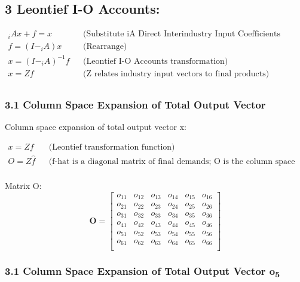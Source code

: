 \documentclass[
  letterpaper,
  DIV=11,
  numbers=noendperiod]{scrartcl}
\begin{document}
\hypertarget{leontief-i-o-accounts}{%
\subsection{3 Leontief I-O Accounts:}\label{leontief-i-o-accounts}}

\[
\begin{align}
    _{i}Ax+f=x && \text{(Substitute iA Direct Interindustry Input Coefficients matrix)}\\
        f=(I-_{i}A)x && \text{(Rearrange)}\\
    x = (I-_{i}A)^{-1}f && \text{(Leontief I-O Accounts transformation)}\\
    x = Zf && \text{(Z relates industry input vectors to final products)}\\
\end{align}
\]

\hypertarget{column-space-expansion-of-total-output-vector}{%
\subsubsection{3.1 Column Space Expansion of Total Output
Vector}\label{column-space-expansion-of-total-output-vector}}

Column space expansion of total output vector x:

\[
\begin{align}
    x = Zf && \text{(Leontief transformation function)}\\
    O = Z\hat{f} && \text{(f-hat is a diagonal matrix of final demands; O is the column space of x)}\\
\end{align}\]

Matrix O: \[\mathbf{O} = \left[\begin{array}
{rrr}
o_{11} & o_{12} & o_{13} & o_{14} & o_{15} & o_{16} \\
o_{21} & o_{22} & o_{23} & o_{24} & o_{25} & o_{26} \\
o_{31} & o_{32} & o_{33} & o_{34} & o_{35} & o_{36} \\
o_{41} & o_{42} & o_{43} & o_{44} & o_{45} & o_{46} \\
o_{51} & o_{52} & o_{53} & o_{54} & o_{55} & o_{56} \\
o_{61} & o_{62} & o_{63} & o_{64} & o_{65} & o_{66} \\
\end{array}\right]
\]

\hypertarget{column-space-expansion-of-total-output-vector-o5}{%
\subsubsection{\texorpdfstring{3.1 Column Space Expansion of Total
Output Vector
o\textsubscript{5}}{3.1 Column Space Expansion of Total Output Vector o5}}\label{column-space-expansion-of-total-output-vector-o5}}
\end{document}
